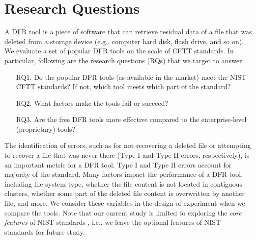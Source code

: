 \section{Research Questions}

A DFR tool is a piece of software that can retrieve residual data of a file that was deleted 
from a storage device (e.g., computer hard disk, flash drive, and so on). We evaluate a set of 
popular DFR tools on the scale of CFTT standards. 
In particular, following are the research questions (RQs) that we target to answer. 

\begin{itemize}
\item[RQ1.] Do the popular DFR tools (as available in the market) meet the NIST CFTT standards? 
If not, which tool meets which part of the standard? 

\item[RQ2.] What factors make the tools fail or succeed?

\item[RQ3.] Are the free DFR tools more effective compared to the enterprise-level (proprietary) tools?
\end{itemize}

The identification of errors, such as for not recovering a deleted file or attempting to recover a file that was never there 
(Type I and Type II errors, respectively), is an important metric for a DFR tool. 
Type I and Type II errors account for majority of the standard. Many factors impact the performance of a DFR tool, 
including file system type, whether the file content is not located in contiguous clusters, whether 
some part of the deleted file content is overwritten by another file, and more.
We consider these variables in the design of experiment when we compare the tools.
Note that our current study is limited to exploring the \emph{core features} of NIST standards \cite{meta:dfr:standards}, 
i.e., we leave the optional features \cite{meta:dfr:standards} of NIST standards for future study.

